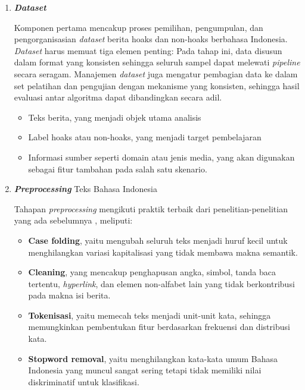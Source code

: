 \begin{enumerate}
\item \textbf{\textit{Dataset}}
    
Komponen pertama mencakup proses pemilihan, pengumpulan, dan pengorganisasian \textit{dataset} berita hoaks dan non-hoaks berbahasa Indonesia. \textit{Dataset} harus memuat tiga elemen penting: 
Pada tahap ini, data disusun dalam format yang konsisten sehingga seluruh sampel dapat melewati \textit{pipeline} secara seragam. Manajemen \textit{dataset} juga mengatur pembagian data ke dalam set pelatihan dan pengujian dengan mekanisme yang konsisten, sehingga hasil evaluasi antar algoritma dapat dibandingkan secara adil.

    \begin{itemize}
        \item Teks berita, yang menjadi objek utama analisis
        \item Label hoaks atau non-hoaks, yang menjadi target pembelajaran
        \item Informasi sumber seperti domain atau jenis media, yang akan digunakan sebagai fitur tambahan pada salah satu skenario.\\
    \end{itemize}



\item \textbf{\textit{Preprocessing}} Teks Bahasa Indonesia

Tahapan \textit{preprocessing} mengikuti praktik terbaik dari penelitian-penelitian yang ada sebelumnya \autocite{pratiwi2022hoax, prasetyo2019evaluation}, meliputi:
    \begin{itemize}
        \item \textbf{Case folding}, yaitu mengubah seluruh teks menjadi huruf kecil untuk menghilangkan variasi kapitalisasi yang tidak membawa makna semantik.

        \item \textbf{Cleaning}, yang mencakup penghapusan angka, simbol, tanda baca tertentu, \textit{hyperlink}, dan elemen non-alfabet lain yang tidak berkontribusi pada makna isi berita.

        \item \textbf{Tokenisasi}, yaitu memecah teks menjadi unit-unit kata, sehingga memungkinkan pembentukan fitur berdasarkan frekuensi dan distribusi kata.

        \item \textbf{Stopword removal}, yaitu menghilangkan kata-kata umum Bahasa Indonesia yang muncul sangat sering tetapi tidak memiliki nilai diskriminatif untuk klasifikasi.


\end{itemize}
\end{enumerate}
